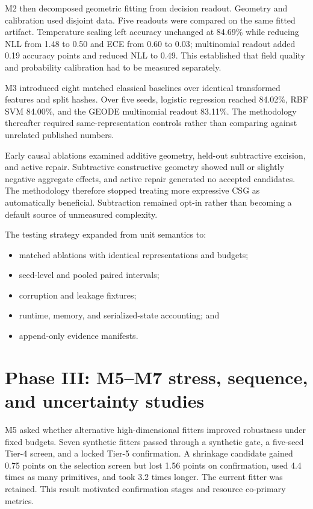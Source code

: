 \documentclass[12pt,oneside]{report}
\begin{document}
M2 then decomposed geometric fitting from decision readout. Geometry and
calibration used disjoint data. Five readouts were compared on the same fitted
artifact. Temperature scaling left accuracy unchanged at 84.69\% while
reducing NLL from 1.48 to 0.50 and ECE from 0.60 to 0.03; multinomial readout
added 0.19 accuracy points and reduced NLL to 0.49. This established that
field quality and probability calibration had to be measured separately.

M3 introduced eight matched classical baselines over identical transformed
features and split hashes. Over five seeds, logistic regression reached
84.02\%, RBF SVM 84.00\%, and the GEODE multinomial readout 83.11\%.
The methodology thereafter required same-representation controls rather than
comparing against unrelated published numbers.

Early causal ablations examined additive geometry, held-out subtractive
excision, and active repair. Subtractive constructive geometry showed null or
slightly negative aggregate effects, and active repair generated no accepted
candidates. The methodology therefore stopped treating more expressive CSG as
automatically beneficial. Subtraction remained opt-in rather than becoming a
default source of unmeasured complexity.

The testing strategy expanded from unit semantics to:

\begin{itemize}
\item matched ablations with identical representations and budgets;
\item seed-level and pooled paired intervals;
\item corruption and leakage fixtures;
\item runtime, memory, and serialized-state accounting; and
\item append-only evidence manifests.
\end{itemize}

\section{Phase III: M5--M7 stress, sequence, and uncertainty studies}

M5 asked whether alternative high-dimensional fitters improved robustness
under fixed budgets. Seven synthetic fitters passed through a synthetic gate,
a five-seed Tier-4 screen, and a locked Tier-5 confirmation. A shrinkage
candidate gained 0.75 points on the selection screen but lost 1.56 points on
confirmation, used 4.4 times as many primitives, and took 3.2 times longer.
The current fitter was retained. This result motivated confirmation stages and
resource co-primary metrics.
\end{document}
